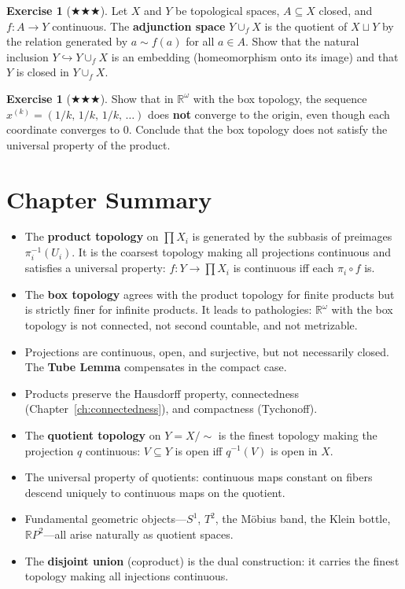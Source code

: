 \documentclass[11pt,a4paper,twoside]{book}
\theoremstyle{remark}
\theoremstyle{definition}
\newtheorem{exerciseplain}[theorem]{Exercise}
\theoremstyle{definition}
\newenvironment{exercise}[1][]{%
  \begin{exerciseplain}[#1]
}{%
  \end{exerciseplain}
}
\begin{document}
\begin{exercise}[$\bigstar\bigstar\bigstar$]\label{exo:attach-spaces}
Let $X$ and $Y$ be topological spaces, $A\subseteq X$ closed, and
$f\colon A\to Y$ continuous.  The \textbf{adjunction space}
$Y\cup_f X$ is the quotient of $X\sqcup Y$ by the relation generated
by $a\sim f(a)$ for all $a\in A$.  Show that the natural inclusion
$Y\hookrightarrow Y\cup_f X$ is an embedding (homeomorphism onto
its image) and that $Y$ is closed in $Y\cup_f X$.
\end{exercise}

\begin{exercise}[$\bigstar\bigstar\bigstar$]\label{exo:box-seq}
Show that in $\mathbb{R}^\omega$ with the box topology, the sequence
$x^{(k)}=(1/k,\,1/k,\,1/k,\,\dots)$ does \textbf{not} converge
to the origin, even though each coordinate converges to $0$.
Conclude that the box topology does not satisfy the universal
property of the product.
\end{exercise}

\section*{Chapter Summary}

\begin{itemize}
\item The \textbf{product topology} on $\prod X_i$ is generated by
      the subbasis of preimages $\pi_i^{-1}(U_i)$.  It is the
      coarsest topology making all projections continuous and
      satisfies a universal property: $f\colon Y\to\prod X_i$ is
      continuous iff each $\pi_i\circ f$ is.
\item The \textbf{box topology} agrees with the product topology
      for finite products but is strictly finer for infinite products.
      It leads to pathologies: $\mathbb{R}^\omega$ with the box
      topology is not connected, not second countable, and not metrizable.
\item Projections are continuous, open, and surjective, but not
      necessarily closed.  The \textbf{Tube Lemma} compensates in
      the compact case.
\item Products preserve the Hausdorff property, connectedness
      (Chapter~\ref{ch:connectedness}), and compactness (Tychonoff).
\item The \textbf{quotient topology} on $Y=X/{\sim}$ is the finest
      topology making the projection $q$ continuous:
      $V\subseteq Y$ is open iff $q^{-1}(V)$ is open in $X$.
\item The universal property of quotients: continuous maps constant
      on fibers descend uniquely to continuous maps on the quotient.
\item Fundamental geometric objects---$S^1$, $T^2$, the M\"obius
      band, the Klein bottle, $\mathbb{R}P^2$---all arise naturally
      as quotient spaces.
\item The \textbf{disjoint union} (coproduct) is the dual
      construction: it carries the finest topology making all
      injections continuous.
\end{itemize}
\end{document}
